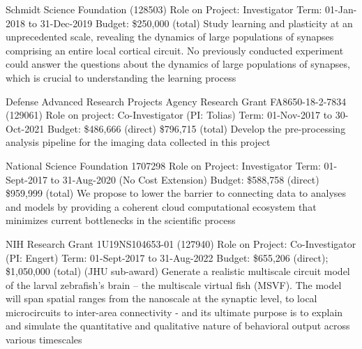 \documentclass[10pt,colorlinks=true,urlcolor=blue]{moderncv}
\begin{document}
{\newline Schmidt Science Foundation (128503)
\newline Role on Project: Investigator
\newline Term: 01-Jan-2018 to 31-Dec-2019
\newline Budget: \$250,000 (total)
\newline Study learning and plasticity at an unprecedented scale, revealing the dynamics of large
populations of synapses comprising an entire local cortical circuit. No previously conducted
experiment could answer the questions about the dynamics of large populations of
synapses, which is crucial to understanding the learning process}{}{}{}{}

{\newline Defense Advanced Research Projects Agency Research Grant FA8650-18-2-7834 (129061)
\newline Role on project: Co-Investigator (PI: Tolias)
\newline Term: 01-Nov-2017 to 30-Oct-2021
\newline Budget: \$486,666 (direct) \$796,715 (total)
\newline Develop the pre-processing analysis pipeline for the imaging data collected in this project}{}{}{}{}

{\newline National Science Foundation 1707298
\newline Role on Project: Investigator
\newline Term: 01-Sept-2017 to 31-Aug-2020 (No Cost Extension)
\newline Budget: \$588,758 (direct) \$959,999 (total)
\newline We propose to lower the barrier to connecting data to analyses and models by providing a
coherent cloud computational ecosystem that minimizes current bottlenecks in the scientific
process}{}{}{}{}

{\newline NIH Research Grant 1U19NS104653-01 (127940)
\newline Role on Project: Co-Investigator (PI: Engert)
\newline Term: 01-Sept-2017 to 31-Aug-2022
\newline Budget: \$655,206 (direct); \$1,050,000 (total) (JHU sub-award)
\newline Generate a realistic multiscale circuit model of the larval zebrafish’s brain – the multiscale
virtual fish (MSVF). The model will span spatial ranges from the nanoscale at the synaptic
level, to local microcircuits to inter-area connectivity - and its ultimate purpose is to explain
and simulate the quantitative and qualitative nature of behavioral output across various
timescales}{}{}{}{}
\end{document}
